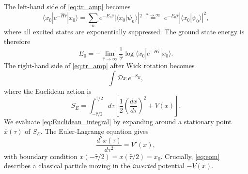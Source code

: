 The left-hand side of \eqref{eq:tr_amp} becomes
\begin{equation}
    \langle x_0|e^{-\hat H\hat\tau}|x_0\rangle
    = \sum_n e^{-E_n\hat\tau}|\langle x_0|\psi_n\rangle|^2
    \;\overset{\hat\tau\to\infty}{=}\;
    e^{-E_0\hat\tau}|\langle x_0|\psi_0\rangle|^2,
\end{equation}
where all excited states are exponentially suppressed. The ground state
energy is therefore
\begin{equation}
    E_0 = -\lim_{\hat\tau\to\infty}\frac{1}{\hat\tau}
    \log\langle x_0|e^{-\hat H\hat\tau}|x_0\rangle.
\end{equation}
The right-hand side of \eqref{eq:tr_amp} after Wick rotation becomes
\begin{equation}
    \int\mathcal{D}x\,e^{-S_E},
    \label{eq:Euclidean_integral}
\end{equation}
where the Euclidean action is
\begin{equation}
    S_E = \int_{-\hat\tau/2}^{\hat\tau/2}d\tau\left[
    \frac{1}{2}\left(\frac{dx}{d\tau}\right)^2 + V(x)\right].
    \label{eq:Euclidean_action}
\end{equation}
We evaluate \eqref{eq:Euclidean_integral} by expanding around a
stationary point $\bar x(\tau)$ of $S_E$. The Euler-Lagrange equation
gives
\begin{equation}
    \frac{d^2 x(\tau)}{d\tau^2} = V'(x),
    \label{eq:eom}
\end{equation}
with boundary condition $x(-\hat\tau/2) = x(\hat\tau/2) = x_0$.
Crucially, \eqref{eq:eom} describes a classical particle moving in the
\emph{inverted} potential $-V(x)$.


